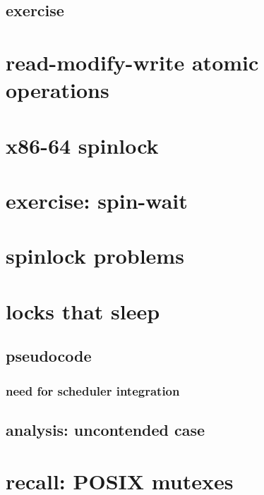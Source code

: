 \subsection{exercise}


\section{read-modify-write atomic operations}


\section{x86-64 spinlock}


\section{exercise: spin-wait}


\section{spinlock problems}


\section{locks that sleep}



\subsection{pseudocode}


\subsubsection{need for scheduler integration}


\subsection{analysis: uncontended case}


\section{recall: POSIX mutexes}


